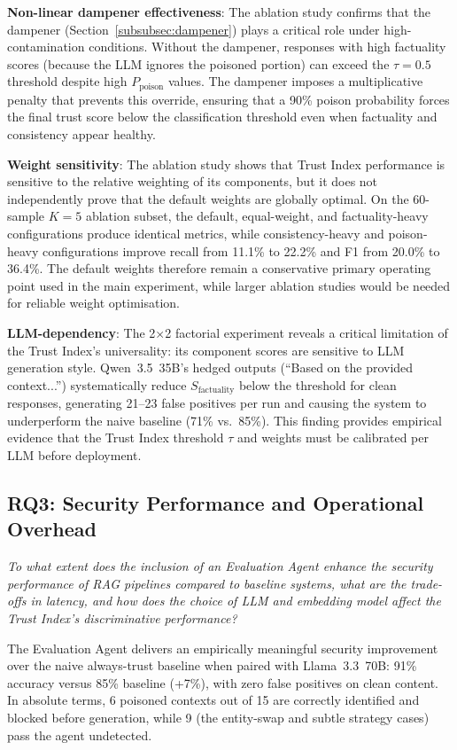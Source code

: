 \textbf{Non-linear dampener effectiveness}: The ablation study confirms that the dampener (Section~\ref{subsubsec:dampener}) plays a critical role under high-contamination conditions. Without the dampener, responses with high factuality scores (because the LLM ignores the poisoned portion) can exceed the $\tau = 0.5$ threshold despite high $P_{\text{poison}}$ values. The dampener imposes a multiplicative penalty that prevents this override, ensuring that a 90\% poison probability forces the final trust score below the classification threshold even when factuality and consistency appear healthy.

\textbf{Weight sensitivity}: The ablation study shows that Trust Index performance is sensitive to the relative weighting of its components, but it does not independently prove that the default weights are globally optimal. On the 60-sample $K=5$ ablation subset, the default, equal-weight, and factuality-heavy configurations produce identical metrics, while consistency-heavy and poison-heavy configurations improve recall from 11.1\% to 22.2\% and F1 from 20.0\% to 36.4\%. The default weights therefore remain a conservative primary operating point used in the main experiment, while larger ablation studies would be needed for reliable weight optimisation.

\textbf{LLM-dependency}: The 2×2 factorial experiment reveals a critical limitation of the Trust Index's universality: its component scores are sensitive to LLM generation style. Qwen~3.5~35B's hedged outputs (``Based on the provided context...'') systematically reduce $S_{\text{factuality}}$ below the threshold for clean responses, generating 21--23 false positives per run and causing the system to underperform the naive baseline (71\% vs.\ 85\%). This finding provides empirical evidence that the Trust Index threshold $\tau$ and weights must be calibrated per LLM before deployment.

\subsection{RQ3: Security Performance and Operational Overhead}

\textit{To what extent does the inclusion of an Evaluation Agent enhance the security performance of RAG pipelines compared to baseline systems, what are the trade-offs in latency, and how does the choice of LLM and embedding model affect the Trust Index's discriminative performance?}

The Evaluation Agent delivers an empirically meaningful security improvement over the naive always-trust baseline when paired with Llama~3.3~70B: 91\% accuracy versus 85\% baseline (+7\%), with zero false positives on clean content. In absolute terms, 6 poisoned contexts out of 15 are correctly identified and blocked before generation, while 9 (the entity-swap and subtle strategy cases) pass the agent undetected.

